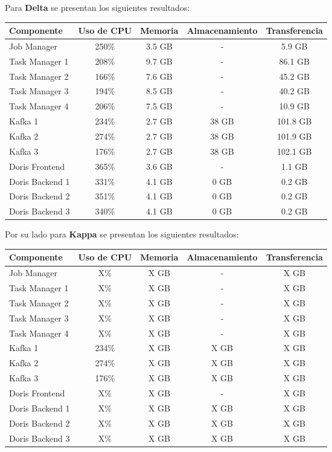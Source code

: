 Para \textbf{Delta} se presentan los siguientes resultados:

\begin{longtable}{|p{3cm}|c|c|c|c|}
    \hline
    \textbf{Componente} & \textbf{Uso de CPU} & \textbf{Memoria} & \textbf{Almacenamiento} & \textbf{Transferencia} \\
    \hline
    Job Manager & 250\% & 3.5 GB & - & 5.9 GB \\
    \hline
    Task Manager 1 & 208\% & 9.7 GB & - & 86.1 GB \\
    \hline
    Task Manager 2 & 166\% & 7.6 GB & - & 45.2 GB \\
    \hline
    Task Manager 3 & 194\% & 8.5 GB & - & 40.2 GB \\
    \hline
    Task Manager 4 & 206\% & 7.5 GB & - & 10.9 GB \\
    \hline
    Kafka 1 & 234\% & 2.7 GB & 38 GB & 101.8 GB \\
    \hline
    Kafka 2 & 274\% & 2.7 GB & 38 GB & 101.9 GB \\
    \hline
    Kafka 3 & 176\% & 2.7 GB & 38 GB & 102.1 GB \\
    \hline
    Doris Frontend & 365\% & 3.6 GB & - & 1.1 GB \\
    \hline
    Doris Backend 1 & 331\% & 4.1 GB & 0 GB & 0.2 GB \\
    \hline
    Doris Backend 2 & 351\% & 4.1 GB & 0 GB & 0.2 GB \\
    \hline
    Doris Backend 3 & 340\% & 4.1 GB & 0 GB & 0.2 GB \\
    \hline
\end{longtable}


Por su lado para \textbf{Kappa} se presentan los siguientes resultados:

\begin{longtable}{|p{3cm}|c|c|c|c|}
    \hline
    \textbf{Componente} & \textbf{Uso de CPU} & \textbf{Memoria} & \textbf{Almacenamiento} & \textbf{Transferencia} \\
    \hline
    Job Manager & X\% & X GB & - & X GB \\
    \hline
    Task Manager 1 & X\% & X GB & - & X GB \\
    \hline
    Task Manager 2 & X\% & X GB & - & X GB \\
    \hline
    Task Manager 3 & X\% & X GB & - & X GB \\
    \hline
    Task Manager 4 & X\% & X GB & - & X GB \\
    \hline
    Kafka 1 & 234\% & X GB & X GB & X GB \\
    \hline
    Kafka 2 & 274\% & X GB & X GB & X GB \\
    \hline
    Kafka 3 & 176\% & X GB & X GB & X GB \\
    \hline
    Doris Frontend & X\% & X GB & - & X GB \\
    \hline
    Doris Backend 1 & X\% & X GB & X GB & X GB \\
    \hline
    Doris Backend 2 & X\% & X GB & X GB & X GB \\
    \hline
    Doris Backend 3 & X\% & X GB & X GB & X GB \\
    \hline
\end{longtable}

